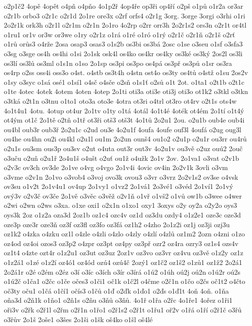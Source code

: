 {o2p1č2
4opě
4opět
o4pň
o4pňo
4o1p2ř
4op4ře
op3ři
op4ří
o2pš
o1pů
o1r2a
or3ar
o2r1b
orbo3
o2r1c
o2r1d
2o1re
ore3x
o2rf
orfs4
o2r1g
3org.
3orge
3orgi
o3rhi
o1ri
2o2r1k
ork3h
o2r1l
o2r1m
o2r1n
2o1ro
4o2rp
o2rr
orr3h
2o2r1s2
ors3n
o2r1t
or4tl
o1ru1
or1v
or3w
or3we
o1ry
o2r1z
o1rá
o1ré
o1ró
o1rý
o2r1č
o2r1ň
o2r1š
o2rť
o1rů
orůs3
o4rže
2osa
osap3
osas3
o1s2b
os3bi
os3bá
2osc
o1se
o3seu
o1sf
o3sfa3
o3sg
o3sge
os4h
os4hi
o1si
2o1sk
osk4l
os4ko
os4kr
os4ky
os3ké
os3ký
2os2l
os3li
os3lí
os3lů
os3ml
o1s1n
o1so
2o1sp
os3pi
os3po
os4pá
os3př
os3pů
o1sr
os3ra
os4rp
o2ss
oss4i
oss3o
o4st.
o4stb
os3t4h
o4stn
ost4o
os3ty
os4tů
o4stž
o1su
2os2v
o1sy
o3syc
o1sá
osé1
o1sí1
o4sč
o4sče
o2sň
o1s1ť
o2sů
o1t
2ot.
o1ta1
o2t1b
o2t1c
o1te
4otec
4otek
4otem
4oten
4otep
2o1ti
oti3a
oti3e
oti3j
oti3o
ot1k2
o3tkl
o3tkn
o3tká
o2t1n
o3tnu
o1to1
oto3a
oto3e
4otra
ot3ri
o4trl
ot3ro
ot4rv
o2t1s
ots4w
4o1t4u1
4otu.
4otup
ot4ur
2o1tv
o1ty
o1tá
4otál
4o1t4é
4oték
ot4ém
2o1tí
o1t4ý
ot4ým
ot1č
2o1tě
o2tň
o1tř
ot3ři
otš3
otš3t
4o1tů
2o2u1
2ou.
o2u1b
oub4e
oub4i
ou4bl
oub3r
oub3ř
2o2u1c
o2ud
ou3e
4o2u1f
4oufa
4oufe
ouf3l
4oufá
o2ug
oug3l
ou4he
ou4hn
ou2i
ou4kl
o2u1l
ou1m
2o2un
ounš4
ou1o2
o2u1p
o2u1r
ou3rr
ou4rů
o2u1s
ou3sm
ous3p
ou3sv
o2ut
o4uta
out3r
out3v
4o2u1v
ou3vě
o2uz
ouú2
2ouč
o3uču
o2uň
o2u1ř
2o4u1š
o4ušt
o2uť
ou1ž
o4užk
2o1v
2ov.
2o1va1
o3vat
o2v1b
o2v3c
ov3ch
ov3de
2o1ve
o4vg
o4vgo
2o1v4i
4ovic
ov4in
2o2v1k
3ovli
o3vm
o3vme
o2v1n
2o1vo
o3vob4
o3voj
ovo3k
ovou3
o3vr
o3vrz
2o2v1s2
ov3se
o4vsk
ov3su
o1v2t
2o1v4u1
ov4up
2o1vy1
o1vz2
2o1vá1
2o3vé1
o3véd
2o1ví1
2o1vý
ový3v
o2v3č
ov3če
2o1vě
o3věc
o3věž
o2v1ň
o1vř
o1vš2
o1vů
ow1b
o3wee
o4wer
o2wi
o2wn
o2ws
o3xa.
o1xe
oxi1
o2x1n
o1xo1
oxy1
3oxys
o2y
oy2a
o2y2o
oys3
oys3k
2oz
o1z2a
oza3d
2oz1b
oz1c4
ozc4v
oz1d
oz3du
ozdy4
o1z2e1
oze3c
oze3d
oze3p
oze3r
oze3ň
oz3f
oz3fl
oz3fo
oz3fá
oz1h2
o4zho
2o1z2i
oz1j
oz3ji
ozj3u
oz1k2
o4zka
o4zku
oz1l
o4zle
o4zli
o4zlo
o4zly
o4zlí
o4zlů
oz1m2
2ozn
o4zni
o1zo
oz4od
oz4oi
ozos3
oz3p2
o4zpr
oz3pt
oz4py
oz3př
ozr2
oz4ra
ozry3
oz1s4
ozs4v
oz1t4
o4zte
ozt4r
o1z2u1
oz3ut
oz3uz
2oz1v
oz3vo
oz3vr
oz4vu
oz3vě
o1z2y
oz1z
o1z2á1
o1zé
o1z2í
oz4ó1
oz4ód
ozú4
ozú4č
2ozý1
oz1č2
oz1š2
o1zů1
oz1ž2
2o2á1
2o2á1r
o2é
o2ém
o2éz
o3í
o3íc
o3ích
o3ír
o3írá
o1ú2
o1úh
oú2j
oú2n
o1ú2r
oú2s
o1ú2č
o1ča1
o2čc
o1če
očes3
o1či1
oč1k
o1č2l
o4čme
o2č1n
o1čo
o2čs
oč1t2
o4čto
oč3ty
oču1
o1čá
o1čí1
očís3
o1čů
o1ď
o2ďk
o1ďo1
o2ďs
o1ď1t
4oň
4oň.
o1ňa
oňa3d
o2ň1k
o1ňo1
o2ň1s
o2ňu
o3ňů
o3ňů.
4o1ř
o1řa
o2řc
4o1ře1
4ořez
o1ři1
oři3v
o2řk
o2ř1l
o2řm
o2ř1n
o1řo1
o2ř1s2
o2ř1t
o1řu1
oř2v
o1řá
o1ří
o2ř1č
o3řů
o3řův
2o1š
2oše1
o3šes
2o1ši
o1šk
oš4ko
o1šl
oš4lé
}
